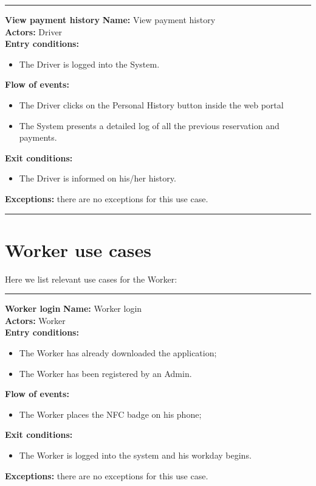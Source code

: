 \begin{center}
\noindent\rule{8cm}{1.0pt}
\end{center}



\textbf{\large View payment history}
\bigbreak
\textbf{Name:} View payment history\\
\textbf{Actors:} Driver \\
\textbf{Entry conditions:} 
\begin{itemize}
\item The Driver is logged into the System.
\end{itemize}
\textbf{Flow of events:} 
\begin{itemize}
\item The Driver clicks on the Personal History button inside the web portal
\item The System presents a detailed log of all the previous reservation and payments.
\end{itemize}
\textbf{Exit conditions:} 
\begin{itemize}
\item The Driver is informed on his/her history.
\end{itemize}
\textbf{Exceptions:} there are no exceptions for this use case.\\


\begin{center}
\noindent\rule{8cm}{1.0pt}
\end{center}


\newpage
\section{Worker use cases}
Here we list relevant use cases for the Worker:\\
\begin{center}
\noindent\rule{8cm}{1.0pt}
\end{center}


\textbf{\large Worker login}
\bigbreak
\textbf{Name:} Worker login \\
\textbf{Actors:} Worker \\
\textbf{Entry conditions:} 
\begin{itemize}
\item The Worker has already downloaded the application;
\item The Worker has been registered by an Admin.
\end{itemize}
\textbf{Flow of events:} 
\begin{itemize}
\item The Worker places the NFC badge on his phone;
\end{itemize}
\textbf{Exit conditions:} 
\begin{itemize}
\item The Worker is logged into the system and his workday begins.
\end{itemize}
\textbf{Exceptions:} there are no exceptions for this use case.\\


